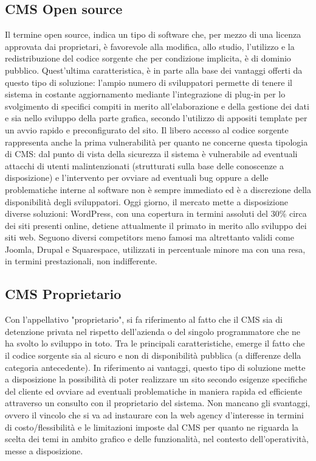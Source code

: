 \subsection{CMS Open source}
Il termine open source, indica un tipo di software che, per mezzo di una licenza approvata dai proprietari, è favorevole alla modifica, allo studio, l'utilizzo e la redistribuzione del codice sorgente che per condizione implicita, è di dominio pubblico. \hfill \break
Quest'ultima caratteristica, è in parte alla base dei vantaggi offerti da questo tipo di soluzione: l'ampio numero di sviluppatori permette di tenere il sistema in costante aggiornamento mediante l'integrazione di plug-in per lo svolgimento di specifici compiti in merito all'elaborazione e della gestione dei dati e sia nello sviluppo della parte grafica, secondo l'utilizzo di appositi template per un avvio rapido e preconfigurato del sito. Il libero accesso al codice sorgente rappresenta anche la prima vulnerabilità per quanto ne concerne questa tipologia di CMS: dal punto di vista della sicurezza il sistema è vulnerabile ad eventuali attacchi di utenti malintenzionati (strutturati sulla base delle conoscenze a disposizione) e l'intervento per ovviare ad eventuali bug oppure a delle problematiche interne al software non è sempre immediato ed è a discrezione della disponibilità degli sviluppatori.
Oggi giorno, il mercato mette a disposizione diverse soluzioni: WordPress, con una copertura in termini assoluti del 30\% circa dei siti presenti online, detiene attualmente il primato in merito allo sviluppo dei siti web. Seguono diversi competitors meno famosi ma altrettanto validi come Joomla, Drupal e Squarespace, utilizzati in percentuale minore ma con una resa, in termini prestazionali, non indifferente.
\clearpage
\subsection{CMS Proprietario}
Con l'appellativo "proprietario", si fa riferimento al fatto che il CMS sia di detenzione privata nel rispetto dell'azienda o del singolo programmatore che ne ha svolto lo sviluppo in toto. Tra le principali caratteristiche, emerge il fatto che il codice sorgente sia al sicuro e non di disponibilità pubblica (a differenze della categoria antecedente). In riferimento ai vantaggi, questo tipo di soluzione mette a disposizione la possibilità di poter realizzare un sito secondo esigenze specifiche del cliente ed ovviare ad eventuali problematiche in maniera rapida ed efficiente attraverso un consulto con il proprietario del sistema. Non mancano gli svantaggi, ovvero il vincolo che si va ad instaurare con la web agency d'interesse in termini di costo/flessibilità e le limitazioni imposte dal CMS per quanto ne riguarda la scelta dei temi in ambito grafico e delle funzionalità, nel contesto dell'operatività, messe a disposizione.\hfill \break

